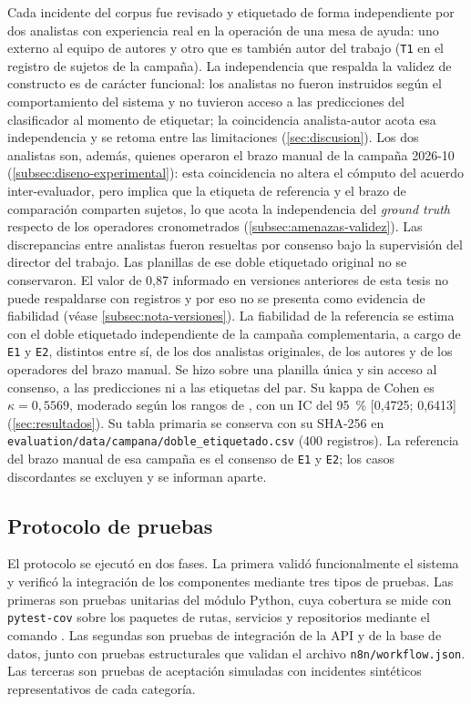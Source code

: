 Cada incidente del corpus fue revisado y etiquetado de forma independiente por dos analistas con experiencia real en la operación de una mesa de ayuda: uno externo al equipo de autores y otro que es también autor del trabajo (\texttt{T1} en el registro de sujetos de la campaña). La independencia que respalda la validez de constructo es de carácter funcional: los analistas no fueron instruidos según el comportamiento del sistema y no tuvieron acceso a las predicciones del clasificador al momento de etiquetar; la coincidencia analista-autor acota esa independencia y se retoma entre las limitaciones (\autoref{sec:discusion}). Los dos analistas son, además, quienes operaron el brazo manual de la campaña 2026-10 (\autoref{subsec:diseno-experimental}): esta coincidencia no altera el cómputo del acuerdo inter-evaluador, pero implica que la etiqueta de referencia y el brazo de comparación comparten sujetos, lo que acota la independencia del \emph{ground truth} respecto de los operadores cronometrados (\autoref{subsec:amenazas-validez}). Las discrepancias entre analistas fueron resueltas por consenso bajo la supervisión del director del trabajo. Las planillas de ese doble etiquetado original no se conservaron. El valor de 0,87 informado en versiones anteriores de esta tesis no puede respaldarse con registros y por eso no se presenta como evidencia de fiabilidad (véase \autoref{subsec:nota-versiones}). La fiabilidad de la referencia se estima con el doble etiquetado independiente de la campaña complementaria, a cargo de \texttt{E1} y \texttt{E2}, distintos entre sí, de los dos analistas originales, de los autores y de los operadores del brazo manual. Se hizo sobre una planilla única y sin acceso al consenso, a las predicciones ni a las etiquetas del par. Su kappa de Cohen \parencite{Cohen1960_kappa} es \(\kappa = 0{,}5569\), moderado según los rangos de \textcite{Landis1977_kappa}, con un IC del 95~\% [0,4725; 0,6413] (\autoref{sec:resultados}). Su tabla primaria se conserva con su SHA-256 en \texttt{evaluation/data/campana/doble\_etiquetado.csv} (400 registros). La referencia del brazo manual de esa campaña es el consenso de \texttt{E1} y \texttt{E2}; los casos discordantes se excluyen y se informan aparte.

\subsection{Protocolo de pruebas}\label{subsec:protocolo-pruebas}

El protocolo se ejecutó en dos fases. La primera validó funcionalmente el sistema y verificó la integración de los componentes mediante tres tipos de pruebas. Las primeras son pruebas unitarias del módulo Python, cuya cobertura se mide con \texttt{pytest-cov} sobre los paquetes de rutas, servicios y repositorios mediante el comando {}. Las segundas son pruebas de integración de la API y de la base de datos, junto con pruebas estructurales que validan el archivo \texttt{n8n/workflow.json}. Las terceras son pruebas de aceptación simuladas con incidentes sintéticos representativos de cada categoría.

